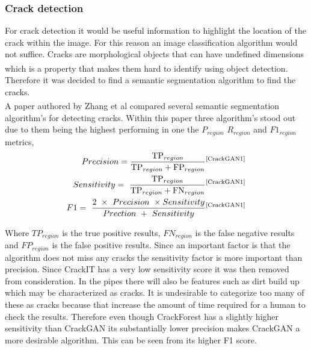 \documentclass[11pt]{article}		%
\newcommand{\supercite}[1]{\textsuperscript{\cite{#1}}}		%
\begin{document}
		\subsubsection{Crack detection}
		
			For crack detection it would be useful information to highlight the location of the crack within the image.
			For this reason an image classification algorithm would not suffice. 
			Cracks are morphological objects that can have undefined dimensions which is a property that makes them hard to identify using object detection.\supercite{morphological}
			Therefore it was decided to find a semantic segmentation algorithm to find the cracks.
			\\
	        A paper authored by Zhang et al\supercite{CrackGAN} compared several semantic segmentation algorithm’s for detecting cracks. 
	        Within this paper three algorithm’s stood out due to them being the highest performing in one the $P_{region}$  $R_{region}$ and $F1_{region}$ metrics,
	        \begin{align}
	        	Precision = \frac{{\rm TP}_{region}}{{\rm TP}_{region}+{\rm FP}_{region}}\supercite{CrackGAN1}
	        	\\
	        	Sensitivity=\ \frac{{\rm TP}_{region}}{{\rm TP}_{region}+{\rm FN}_{region}}\supercite{CrackGAN1}
	        	\\
	        	F1=\ \frac{2\ \times\ Precision\ \times Sensitivity}{Prection\ +\ Sensitivity}\supercite{CrackGAN1}
	        \end{align}
	    
	       Where $TP_{region}$ is the true positive results, $FN_{region}$ is the false negative results and $FP_{region}$ is the false positive results. Since an important factor is that the algorithm does not miss any cracks the sensitivity factor is more important than precision. 
	        Since CrackIT has a very low sensitivity score it was then removed from consideration. 
	        In the pipes there will also be features such as dirt build up which may be characterized as cracks. 
	        It is undesirable to categorize too many of these as cracks because that increase the amount of time required for a human to check the results.
	        Therefore even though CrackForest has a slightly higher sensitivity than CrackGAN its substantially lower precision makes CrackGAN a more desirable algorithm. 
	        This can be seen from its higher F1 score.
        	
\end{document}
